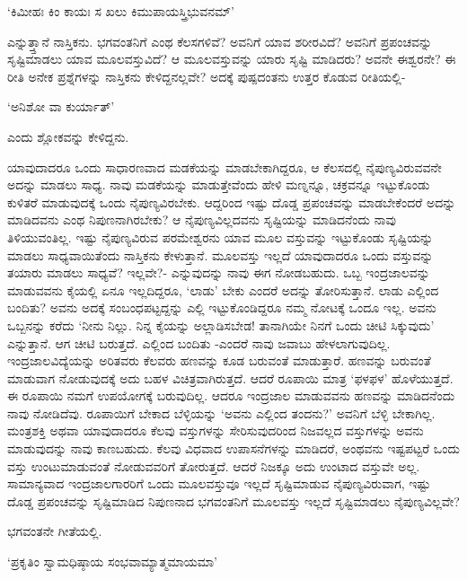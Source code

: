 \begin{shloka}
`ಕಿಮೀಹಃ ಕಿಂ ಕಾಯಃ ಸ ಖಲು ಕಿಮುಪಾಯಸ್ತ್ರಿಭುವನಮ್'
\end{shloka}

ಎನ್ನುತ್ತ್ತಾನೆ ನಾಸ್ತಿಕನು. ಭಗವಂತನಿಗೆ ಎಂಥ ಕೆಲಸಗಳಿವೆ? ಅವನಿಗೆ ಯಾವ ಶರೀರವಿದೆ? ಅವನಿಗೆ ಪ್ರಪಂಚವನ್ನು ಸೃಷ್ಟಿಮಾಡಲು ಯಾವ ಮೂಲವಸ್ತುವಿದೆ? ಆ ಮೂಲವಸ್ತುವನ್ನು ಯಾರು ಸೃಷ್ಟಿ ಮಾಡಿದರು? ಅವನೇ ಈಶ್ವರನೇ? ಈ ರೀತಿ ಅನೇಕ ಪ್ರಶ್ನೆಗಳನ್ನು ನಾಸ್ತಿಕನು ಕೇಳಿದ್ದನಲ್ಲವೇ? ಅದಕ್ಕೆ ಪುಷ್ಪದಂತನು ಉತ್ತರ ಕೊಡುವ ರೀತಿಯಲ್ಲಿ-

\begin{shloka}
`ಅನಿಶೋ ವಾ ಕುರ್ಯಾತ್'
\end{shloka}

ಎಂದು ಶ್ಲೋಕವನ್ನು ಕೇಳಿದ್ದನು.

ಯಾವುದಾದರೂ ಒಂದು ಸಾಧಾರಣವಾದ ಮಡಕೆಯನ್ನು ಮಾಡಬೇಕಾಗಿದ್ದರೂ, ಆ ಕೆಲಸದಲ್ಲಿ ನೈಪುಣ್ಯವಿರುವವನೇ ಅದನ್ನು ಮಾಡಲು ಸಾಧ್ಯ. ನಾವು ಮಡಕೆಯನ್ನು ಮಾಡುತ್ತೇವೆಂದು ಹೇಳಿ ಮಣ್ನನ್ನೂ, ಚಕ್ರವನ್ನೂ ಇಟ್ಟುಕೊಂಡು ಕುಳಿತರೆ ಮಾಡುವುದಕ್ಕೆ ಒಂದು ನೈಪುಣ್ಯವಿರಬೇಕು. ಆದ್ದರಿಂದ ಇಷ್ಟು ದೊಡ್ಡ ಪ್ರಪಂಚವನ್ನು ಮಾಡಬೇಕೆಂದರೆ ಅದನ್ನು ಮಾಡಿದವನು ಎಂಥ ನಿಪುಣನಾಗಿರಬೇಕು? ಆ ನೈಪುಣ್ಯವಿಲ್ಲದವನು ಸೃಷ್ಟಿಯನ್ನು ಮಾಡಿದನೆಂದು ನಾವು ತಿಳಿಯುವಂತಿಲ್ಲ. ಇಷ್ಟು ನೈಪುಣ್ಯವಿರುವ ಪರಮೇಶ್ವರನು ಯಾವ ಮೂಲ ವಸ್ತುವನ್ನು ಇಟ್ಟುಕೊಂಡು ಸೃಷ್ಟಿಯನ್ನು ಮಾಡಲು ಸಾಧ್ಯವಾಯಿತೆಂದು ನಾಸ್ತಿಕನು ಕೇಳುತ್ತಾನೆ. ಮೂಲವಸ್ತು ಇಲ್ಲದೆ ಯಾವುದಾದರೂ ಒಂದು ವಸ್ತುವನ್ನು ತಯಾರು ಮಾಡಲು ಸಾಧ್ಯವೆ? ಇಲ್ಲವೇ?- ಎನ್ನುವುದನ್ನು ನಾವು ಈಗ ನೋಡಬಹುದು. ಒಬ್ಬ ಇಂದ್ರಜಾಲವನ್ನು ಮಾಡುವವನು ಕೈಯಲ್ಲಿ ಏನೂ ಇಲ್ಲದಿದ್ದರೂ, `ಲಾಡು' ಬೇಕು ಎಂದರೆ ಅದನ್ನು ತೋರಿಸುತ್ತಾನೆ. ಲಾಡು ಎಲ್ಲಿಂದ ಬಂದಿತು? ಅವನು ಅದಕ್ಕೆ ಸಂಬಂಧಪಟ್ಟದ್ದನ್ನು ಎಲ್ಲಿ ಇಟ್ಟುಕೊಂಡಿದ್ದರೂ ನಮ್ಮ ನೋಟಕ್ಕೆ ಒಂದೂ ಇಲ್ಲ. ಅವನು ಒಬ್ಬನನ್ನು ಕರೆದು `ನೀನು ನಿಲ್ಲು. ನಿನ್ನ ಕೈಯನ್ನು ಅಲ್ಲಾಡಿಸಬೇಡ! ತಾನಾಗಿಯೇ ನಿನಗೆ ಒಂದು ಚೀಟಿ ಸಿಕ್ಕುವುದು' ಎನ್ನುತ್ತಾನೆ. ಆಗ ಚೀಟಿ ಬರುತ್ತದೆ. ಎಲ್ಲಿಂದ ಬಂದಿತು -ಎಂದರೆ ನಾವು ಜವಾಬು ಹೇಳಲಾಗುವುದಿಲ್ಲ. ಇಂದ್ರಜಾಲವಿದ್ಯೆಯನ್ನು ಅರಿತವರು ಕೆಲವರು ಹಣವನ್ನು ಕೂಡ ಬರುವಂತೆ ಮಾಡುತ್ತಾರೆ. ಹಣವನ್ನು ಬರುವಂತೆ ಮಾಡುವಾಗ ನೋಡುವುದಕ್ಕೆ ಅದು ಬಹಳ ವಿಚಿತ್ರವಾಗಿರುತ್ತದೆ. ಆದರೆ ರೂಪಾಯಿ ಮಾತ್ರ `ಫಳಫಳ' ಹೊಳೆಯುತ್ತದೆ. ಈ ರೂಪಾಯಿ ನಮಗೆ ಉಪಯೋಗಕ್ಕೆ ಬರುವುದಿಲ್ಲ. ಆದರೂ ಇಂದ್ರಜಾಲ ಮಾಡುವವನು ಹಣವನ್ನು ಮಾಡಿದನೆಂದು ನಾವು ನೋಡಿದೆವು. ರೂಪಾಯಿಗೆ ಬೇಕಾದ ಬೆಳ್ಳಿಯನ್ನು `ಅವನು ಎಲ್ಲಿಂದ ತಂದನು?' ಅವನಿಗೆ ಬೆಳ್ಳಿ ಬೇಕಾಗಿಲ್ಲ. ಮಂತ್ರಶಕ್ತಿ ಅಥವಾ ಯಾವುದಾದರೂ ಕೆಲವು ವಸ್ತುಗಳನ್ನು ಸೇರಿಸುವುದರಿಂದ ನಿಜವಲ್ಲದ ವಸ್ತುಗಳನ್ನು ಅವನು ಮಾಡುವುದನ್ನು ನಾವು ಕಾಣಬಹುದು. ಕೆಲವು ವಿಧವಾದ ಉಪಾಸನೆಗಳನ್ನು ಮಾಡಿದರೆ, ಅಂಥವನು ಇಷ್ಟಪಟ್ಟರೆ ಒಂದು ವಸ್ತು ಉಂಟುಮಾಡುವಂತೆ ನೋಡುವವರಿಗೆ ತೋರುತ್ತದೆ. ಆದರೆ ನಿಜಕ್ಕೂ ಅದು ಉಂಟಾದ ವಸ್ತುವೇ ಅಲ್ಲ. ಸಾಮಾನ್ಯವಾದ ಇಂದ್ರಜಾಲಗಾರರಿಗೆ ಒಂದು ಮೂಲವಸ್ತುವೂ ಇಲ್ಲದೆ ಸೃಷ್ಟಿಮಾಡುವ ನೈಪುಣ್ಯವಿರುವಾಗ, ಇಷ್ಟು ದೊಡ್ಡ ಪ್ರಪಂಚವನ್ನು ಸೃಷ್ಟಿಮಾಡಿದ ನಿಪುಣನಾದ ಭಗವಂತನಿಗೆ ಮೂಲವಸ್ತು ಇಲ್ಲದೆ ಸೃಷ್ಟಿಮಾಡಲು ನೈಪುಣ್ಯವಿಲ್ಲವೇ?

ಭಗವಂತನೇ ಗೀತೆಯಲ್ಲಿ.

\begin{shloka}
`ಪ್ರಕೃತಿಂ ಸ್ವಾಮಧಿಷ್ಠಾಯ ಸಂಭವಾಮ್ಯಾತ್ಮಮಾಯಮಾ'
\end{shloka}


